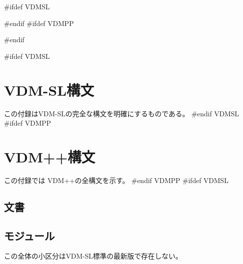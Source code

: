 \documentclass[\pformat,12pt]{jarticle}
\newcommand{\vdmpp}{VDM++}
\begin{document}
\newpage


%
#ifdef VDMSL

#endif
#ifdef VDMPP

#endif

\newpage
\appendix


#ifdef VDMSL
\section{VDM-SL構文} \label{app-a} この付録はVDM-SLの完全な構文を明確にするものである。
#endif VDMSL
#ifdef VDMPP
\section{VDM++構文} \label{app-a}
この付録では \vdmpp の全構文を示す。
#endif VDMPP
#ifdef VDMSL
\subsection{文書}



\subsection{モジュール}

この全体の小区分はVDM-SL標準の最新版で存在しない。



\end{document}
